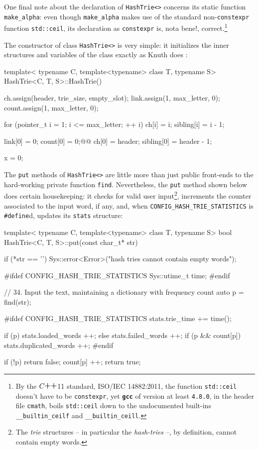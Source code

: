 \documentclass[a4paper,11pt]{article}
\renewcommand{\=}{\protect\nobreakdash-\hspace{0pt}}
\renewcommand{\~}{\protect\nobreakdash--\hspace{0pt}}
\newcommand{\plusplus}{\textbf{\raisebox{1pt}{++}}}
\newcommand{\cplusplus}{$C\plusplus$}
\newcommand{\code}[1]{{\tt{#1}}}
\newcommand\code*[1]{\mbox{\code{#1}}}
\newcommand{\prog}[1]{{\tt\textbf{#1}}}
\newcommand{\pg}[1]{p.~#1}
\newcommand{\para}[1]{\mbox{\S\hspace{1pt}#1}}
\newcommand{\parapg}[2]{\para{#1}, \pg{#2}}
\newcommand{\define}{\code{{\#}define}}%
\begin{document}
One final note about the declaration of \code{HashTrie<>} concerns its static
function \code{make\_alpha}: even though \code{make\_alpha} makes use of
the standard non-\code{constexpr} function \code{std::ceil}, its declaration as
\code{constexpr} is, nota bene!, correct.\footnote{%
By the \cplusplus11 standard, ISO/IEC 14882:2011,
the function \code{std::ceil} doesn't have to be \code{constexpr}, yet
\prog{gcc} of version at least \code{4.8.0}, in the header file \code{cmath},
boils \code{std::ceil} down to the undocumented built-ins
\code{\_\_builtin\_ceilf} and 
\code{\_\_builtin\_ceill}.}

The constructor of class \code{HashTrie<>} is very simple: it initializes the
inner structures and variables of the class exactly as Knuth does 
\cite[\parapg{19}{159} and \parapg{23}{160}]{knuth:literate}:
%
%
\begin{hashtrielisting}[2275]
template<
	typename C,
	template<typename> class T,
	typename S>
HashTrie<C, T, S>::HashTrie()
{
	ch.assign(header, trie_size, empty_slot);
	link.assign(1, max_letter, 0);
	count.assign(1, max_letter, 0);

	for (pointer_t i = 1; i <= max_letter; ++ i) {
		ch[i] = i;
		sibling[i] = i - 1;
	}

	link[0] = 0;
	count[0] = 0;@\label{cpp-init-count-zero}@
	ch[0] = header;
	sibling[0] = header - 1;

	x = 0;
}
\end{hashtrielisting}
%
The \code{put} methods of \code{HashTrie<>} are little more than just public
front-ends to the hard-working private function \code{find}. Nevertheless,
the \code{put} method shown below does certain housekeeping:
it checks for valid user input\footnote{The \emph{trie} structures
\cite[\para{6.3}]{knuth:taocp3}
-- in particular the \emph{hash-tries} --, by definition, cannot
contain empty words.}, increments the counter associated to the input word,
if any, and, when \code{CONFIG\_HASH\_TRIE\_STATISTICS}
is \define d, updates its \code{stats} structure:
%
%
\begin{hashtrielisting}[2621]
template<
	typename C,
	template<typename> class T,
	typename S>
bool HashTrie<C, T, S>::put(const char_t* str)
{
	if (*str == '\0')
		Sys::error<Error>("hash tries cannot contain empty words");

#ifdef CONFIG_HASH_TRIE_STATISTICS
	Sys::utime_t time;
#endif

	// 34. Input the text, maintaining a dictionary with frequency count
	auto p = find(str);

#ifdef CONFIG_HASH_TRIE_STATISTICS
	stats.trie_time += time();

	if (p)
		stats.loaded_words ++;
	else
		stats.failed_words ++;
	if (p && count[p])
		stats.duplicated_words ++;
#endif

	if (!p) return false;
	count[p] ++;
	return true;
}
\end{hashtrielisting}
\end{document}
